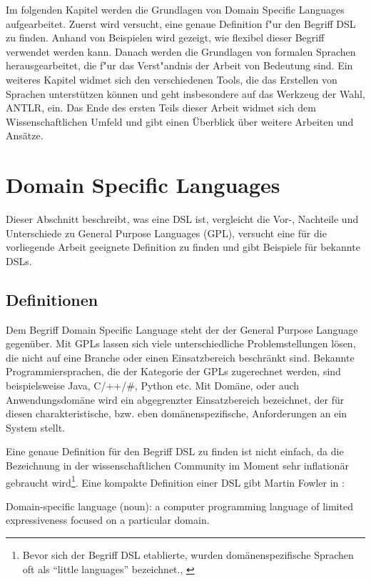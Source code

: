 Im folgenden Kapitel werden die Grundlagen von Domain Specific Languages aufgearbeitet. 
Zuerst wird versucht, eine genaue Definition f"ur den Begriff DSL zu finden. 
Anhand von Beispielen wird gezeigt, wie flexibel dieser Begriff verwendet werden kann. 
Danach werden die Grundlagen von formalen Sprachen herausgearbeitet, die f"ur das Verst"andnis der Arbeit von Bedeutung sind. 
Ein weiteres Kapitel widmet sich den verschiedenen Tools, die das Erstellen von Sprachen unterstützen können und geht insbesondere auf das Werkzeug der Wahl, ANTLR, ein.
Das Ende des ersten Teils dieser Arbeit widmet sich dem Wissenschaftlichen Umfeld und gibt einen Überblick über weitere Arbeiten und Ansätze.



\newpage

\chapter{Domain Specific Languages}
\label{chapter_dsl}

Dieser Abschnitt beschreibt, was eine DSL ist, vergleicht die Vor-, Nachteile und Unterschiede zu General Purpose Languages (GPL), versucht eine für die vorliegende Arbeit geeignete Definition zu finden und gibt Beispiele für bekannte DSLs.

\section{Definitionen}

Dem Begriff Domain Specific Language steht der der General Purpose Language gegenüber. Mit GPLs lassen sich viele unterschiedliche Problemstellungen lösen, die nicht auf eine Branche oder einen Einsatzbereich beschränkt sind. Bekannte Programmiersprachen, die der Kategorie der GPLs zugerechnet werden, sind beispielsweise Java, C/++/\#, Python etc. Mit Domäne, oder auch Anwendungsdomäne wird ein abgegrenzter Einsatzbereich bezeichnet, der für diesen charakteristische, bzw. eben domänenspezifische, Anforderungen an ein System stellt.

Eine genaue Definition für den Begriff DSL zu finden ist nicht einfach, da die Bezeichnung in der wissenschaftlichen Community im Moment sehr inflationär gebraucht wird\footnote{Bevor sich der Begriff DSL etablierte, wurden domänenspezifische Sprachen oft als ``little languages'' bezeichnet., \cite{VaDe00}}. Eine kompakte Definition einer DSL gibt Martin Fowler in \cite{Fowl05}:

\begin{myquote}
Domain-specific language (noun): a computer programming language of limited expressiveness focused on a particular domain.
\end{myquote}

